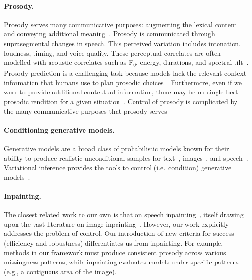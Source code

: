\documentclass[a4paper,12pt,twoside,openright]{article}
\newcommand{\fzero}{F\textsubscript{0}}
\begin{document}
\paragraph{Prosody.} Prosody serves many communicative purposes: augmenting the lexical content~\parencite{calhoun:information-structure:2010,trang-thesis:2020,grounding:1991} and conveying additional meaning~\parencite{turn-taking:2009,prosody-irony:2011,prosody-humour:2017,joint-prosody-semantics:emotion:2016}. Prosody is communicated through suprasegmental changes in speech. This perceived variation includes intonation, loudness, timing, and voice quality. These perceptual correlates are often modelled with acoustic correlates such as \fzero, energy, durations, and spectral tilt~\parencite{CHiVE:2019,aggregated-prosody:2019,fastspeech-2:2020,raitio20interspeech,PaperCup-Ctrl-P:2021}. Prosody prediction is a challenging task because models lack the relevant context information that humans use to plan prosodic choices~\parencite{context-definition:1992}. Furthermore, even if we were to provide additional contextual information, there may be no single best prosodic rendition for a given situation~\parencite{zack-SSW19:2019}. Control of prosody is complicated by the many communicative purposes that prosody serves~\parencite{grounding:1991}

\paragraph{Conditioning generative models.} Generative models are a broad class of probabilistic models known for their ability to produce realistic unconditional samples for text~\parencite{brown2020language}, images~\parencite{rombach2022high,ramesh2022hierarchical}, and speech~\parencite{VQ-VAE:2017}. Variational inference provides the tools to control (i.e.\ condition) generative models~\parencite{conditional-VAE:2015,mirza2014conditional,winkler2020learning}.

\paragraph{Inpainting.} The closest related work to our own is that on speech inpainting~\parencite{Borsos2022SpeechPainterTS}, itself drawing upon the vast literature on image inpainting~\parencite{Elharrouss2019ImageIA}. However, our work explicitly addresses the problem of control. Our introduction of new criteria for success (efficiency and robustness) differentiates us from inpainting. For example, methods in our framework must produce consistent prosody across various missingness patterns, while inpainting evaluates models under specific patterns (e.g., a contiguous area of the image).
\end{document}
